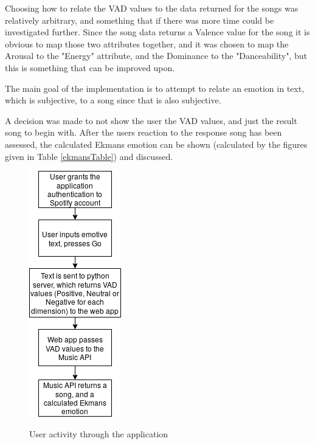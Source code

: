 Choosing how to relate the VAD values to the data returned for the songs was relatively arbitrary, and something that if there was more time could be investigated further. Since the song data returns a Valence value for the song it is obvious to map those two attributes together, and it was chosen to map the Arousal to the "Energy" attribute, and the Dominance to the "Danceability", but this is something that can be improved upon.

The main goal of the implementation is to attempt to relate an emotion in text, which is subjective, to a song since that is also subjective.

A decision was made to not show the user the VAD values, and just the result song to begin with. After the users reaction to the response song has been assessed, the calculated Ekmans emotion can be shown (calculated by the figures given in Table \ref{ekmansTable}) and discussed. 

\begin{figure}[ht]
\caption{User activity through the application}
\centering
\includegraphics[scale=0.6]{litImgs/interfaceFlow.png}
\label{implementationLayout}
\end{figure}

